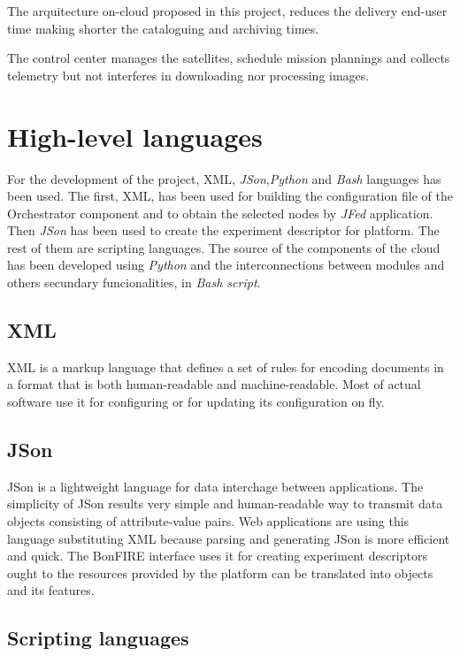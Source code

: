 The arquitecture on-cloud proposed in this project, reduces the delivery
end-user time making shorter the cataloguing and archiving times.

The control center manages the satellites, schedule mission plannings and
collects telemetry but not interferes in downloading nor processing images.


\section{High-level languages}

For the development of the project, \ac{XML}, \emph{JSon},\emph{Python} and \emph{Bash} languages has
been used. The first, \ac{XML}, has been used for building the configuration file of
the Orchestrator component and to obtain the selected nodes by \emph{JFed}
application. Then \emph{JSon} has been used to create the experiment descriptor for
\bonfire platform. The rest of them are scripting languages. The source of the
components of the cloud has been developed using \emph{Python} and the interconnections
between modules and others secundary funcionalities, in \emph{Bash script}.

\subsection{XML}
\ac{XML} is a markup language that defines a set of rules for encoding
documents in a format that is both human-readable and machine-readable. Most of
actual software use it for configuring or for updating its configuration on fly.

\subsection{JSon}

JSon is a lightweight language for data interchage between applications. The
simplicity of JSon results very simple and human-readable way to transmit data
objects consisting of attribute-value pairs. Web applications are using this
language substituting XML because parsing and generating JSon is more efficient
and quick. The BonFIRE interface uses it for creating experiment descriptors
ought to the resources provided by the platform can be translated into objects
and its features.

\subsection{Scripting languages}

